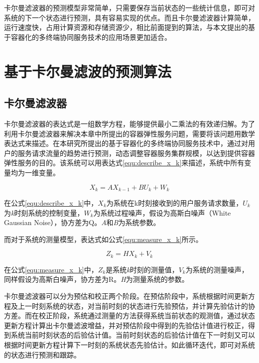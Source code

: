 卡尔曼滤波器的预测模型非常简单，只需要保存当前状态的一些统计信息，即可对系统的下一个状态进行预测，具有容易实现的优点。而且卡尔曼滤波器计算简单，运行速度快，占用计算资源和存储资源少，相比前面提到的算法，与本文提出的基于容器化的多终端协同服务技术的应用场景更加适合。

\section{基于卡尔曼滤波的预测算法}\label{sec:elastic_service_Kalman_filtering}
\subsection{卡尔曼滤波器}

卡尔曼滤波器的表达式是一组数学方程，能够提供最小二乘法的有效递归解\cite{彭丁聪2009卡尔曼滤波的基本原理及应用}。为了利用卡尔曼滤波器来解决本章中所提出的容器弹性服务问题，需要将该问题用数学表达式来描述。在本研究所提出的基于容器化的多终端协同服务技术中，通过对用户的服务请求流量的趋势进行预测，动态调整容器服务集群规模，以达到提供容器弹性服务的目的。该系统可以用表达式\ref{equ:describe_x_k}来描述，系统中所有变量均为一维变量。

\begin{equation}\label{equ:describe_x_k}
    X_k=AX_{k-1}+BU_{k}+W_{k}
\end{equation}

在公式\ref{equ:describe_x_k}中，$X_k$为系统在k时刻接收到的用户服务请求数量，$U_{k}$为\emph{k}时刻系统的控制变量，$W_k$为系统过程噪声，假设为高斯白噪声（White Gaussian Noise），协方差为Q。\emph{A}和\emph{B}为系统参数。

而对于系统的测量模型，表达式如公式\ref{equ:measure_x_k}所示。

\begin{equation}\label{equ:measure_x_k}
    Z_k=HX_{k}+V_{k}
\end{equation}

在公式\ref{equ:measure_x_k}中，$Z_k$是系统\emph{k}时刻的测量值，$V_k$为系统的测量噪声，同样假设为高斯白噪声，协方差为R。\emph{H}为测量系统的参数。

卡尔曼滤波器可以分为预估和校正两个阶段\cite{彭丁聪2009卡尔曼滤波的基本原理及应用}。在预估阶段中，系统根据时间更新方程及上一时刻系统的状态，对当前时刻的状态进行先验预估，并计算先验估计的协方差。而在校正阶段，系统通过测量的方法获得系统当前状态的观测值，通过状态更新方程计算出卡尔曼滤波增益，并对预估阶段中得到的先验估计值进行校正，得到系统当前时刻状态的后验估计值。当前时刻状态的后验估计值在下一时刻又可以根据时间更新方程计算下一时刻的系统状态先验估计。如此循环迭代，即可对系统的状态进行预测和跟踪。

